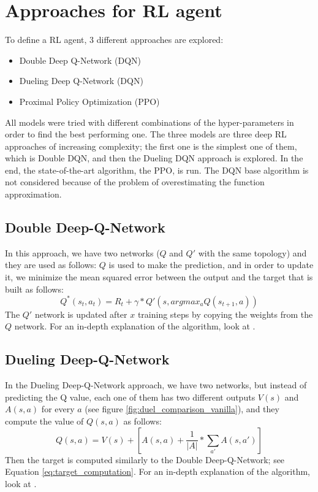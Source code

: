 \documentclass{article}
\begin{document}
\section{Approaches for RL agent} \label{section:Approaches}
To define a RL agent, 3 different approaches are explored:
\begin{itemize}
    \item Double Deep Q-Network (DQN) \cite{DoubleDeepQNetwork}
    \item Dueling Deep Q-Network (DQN) \cite{DuelDeepQNetwork}
    \item Proximal Policy Optimization (PPO) \cite{PPO}
\end{itemize}
All models were tried with different combinations of the hyper-parameters in order to find the best performing one.
The three models are three deep RL approaches of increasing complexity; the first one is the simplest one of them, which is Double DQN, and then the Dueling DQN approach is explored. In the end, the state-of-the-art algorithm, the PPO, is run. The DQN base algorithm is not considered because of the problem of overestimating the function approximation.

\subsection{Double Deep-Q-Network} \label{subsection:Double}
In this approach, we have two networks ($Q$ and $Q'$ with the same topology) and they are used as follows: $Q$ is used to make the prediction, and in order to update it, we minimize the mean squared error between the output and the target that is built as follows:
\begin{equation}\label{eq:target_computation}
    Q^*(s_t,a_t) = R_t + \gamma * Q'(s, argmax_a Q(s_{t+1},a))
\end{equation}
The $Q'$ network is updated after $x$ training steps by copying the weights from the $Q$ network.
For an in-depth explanation of the algorithm, look at \cite{DoubleDeepQNetwork}.

\subsection{Dueling Deep-Q-Network} \label{subsection:Duel}
In the Dueling Deep-Q-Network approach, we have two networks, but instead of predicting the Q value, each one of them has two different outputs $V(s)$ and $A(s,a)$ for every $a$ (see figure \ref{fig:duel_comparison_vanilla}), and they compute the value of $Q(s,a)$ as follows:
\begin{equation} \label{eq:q_v_a}
    Q(s,a) = V(s) + [A(s,a) + \frac{1}{|A|} *  \sum_{a'} A(s, a')]
\end{equation}
Then the target is computed similarly to the Double Deep-Q-Network; see Equation \ref{eq:target_computation}. For an in-depth explanation of the algorithm, look at \cite{DuelDeepQNetwork}.
\end{document}
